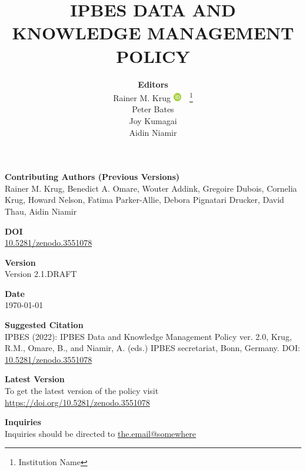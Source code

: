 \documentclass{article}
\title{IPBES DATA AND KNOWLEDGE MANAGEMENT POLICY}
\author{
    \LARGE \textbf{Editors} \\[0.5cm]  %
    Rainer M. Krug \href{https://orcid.org/0000-0002-7490-0066}{\includegraphics[width=10pt]{orcid.png}}\ \href{mailto:Rainer@Krugs.de}{\faEnvelope}\ \thanks{Institution Name} \\
    Peter Bates \\ 
    Joy Kumagai \\
    Aidin Niamir
}
\date{}
\begin{document}
\renewcommand{\author}{Editors}
\maketitle


\begin{center}

    {\LARGE \textbf{Contributing Authors (Previous Versions)}} \\[0.5em]
    Rainer M. Krug, Benedict A. Omare, Wouter Addink, Gregoire Dubois, Cornelia Krug, Howard Nelson, Fatima Parker-Allie, Debora Pignatari Drucker, David Thau, Aidin Niamir
    
    \vspace{1.5em}
    
    {\LARGE \textbf{DOI}} \\[0.5em]
    \href{https://doi.org/10.5281/zenodo.3551078}{10.5281/zenodo.3551078}
    
    \vspace{1.5em}
    
    {\LARGE \textbf{Version}} \\[0.5em]
    Version 2.1.DRAFT
    
    \vspace{1.5em}
    
    {\LARGE \textbf{Date}} \\[0.5em]
    \today
    
    \vspace{1.5em}
    
    {\LARGE \textbf{Suggested Citation}} \\[0.5em]
    IPBES (2022): IPBES Data and Knowledge Management Policy ver. 2.0, Krug, R.M., Omare, B., and Niamir, A. (eds.) IPBES secretariat, Bonn, Germany. DOI: \href{https://doi.org/10.5281/zenodo.3551078}{10.5281/zenodo.3551078}
    
    \vspace{1.5em}
    
    {\LARGE \textbf{Latest Version}} \\[0.5em]
    To get the latest version of the policy visit \href{https://doi.org/10.5281/zenodo.3551078}{https://doi.org/10.5281/zenodo.3551078}
    
    \vspace{1.5em}
    
    {\LARGE \textbf{Inquiries}} \\[0.5em]
    Inquiries should be directed to \href{mailto:the.email@somewhere}{the.email@somewhere}

\end{center}
\end{document}
